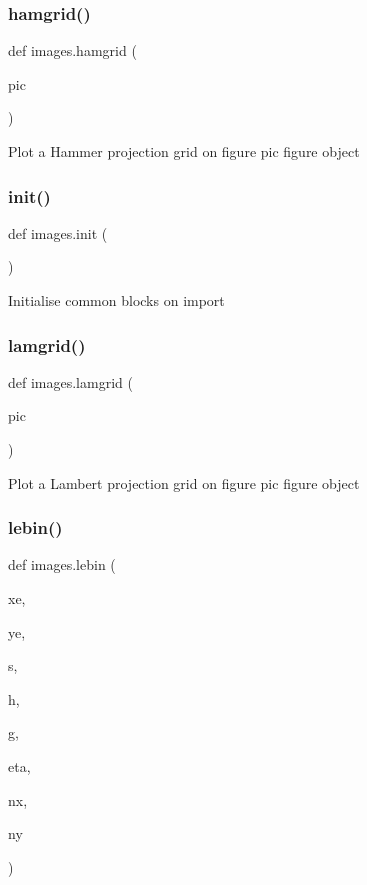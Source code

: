 \subsubsection{\texorpdfstring{hamgrid()}{hamgrid()}}
{\footnotesize\ttfamily def images.\+hamgrid (\begin{DoxyParamCaption}\item[{}]{pic }\end{DoxyParamCaption})}

\begin{DoxyVerb}Plot a Hammer projection grid on figure
    pic     figure object
\end{DoxyVerb}
 \mbox{\label{namespaceimages_ac92b24c860ad521a28ab90e93ca5abfb}} 
\subsubsection{\texorpdfstring{init()}{init()}}
{\footnotesize\ttfamily def images.\+init (\begin{DoxyParamCaption}{ }\end{DoxyParamCaption})}

\begin{DoxyVerb}Initialise common blocks on import\end{DoxyVerb}
 \mbox{\label{namespaceimages_ad402eee968601fff4f6274f444c60b94}} 
\subsubsection{\texorpdfstring{lamgrid()}{lamgrid()}}
{\footnotesize\ttfamily def images.\+lamgrid (\begin{DoxyParamCaption}\item[{}]{pic }\end{DoxyParamCaption})}

\begin{DoxyVerb}Plot a Lambert projection grid on figure
    pic     figure object
\end{DoxyVerb}
 \mbox{\label{namespaceimages_a79aa7fa090e0f357563943c408dab1da}} 
\subsubsection{\texorpdfstring{lebin()}{lebin()}}
{\footnotesize\ttfamily def images.\+lebin (\begin{DoxyParamCaption}\item[{}]{xe,  }\item[{}]{ye,  }\item[{}]{s,  }\item[{}]{h,  }\item[{}]{g,  }\item[{}]{eta,  }\item[{}]{nx,  }\item[{}]{ny }\end{DoxyParamCaption})}

